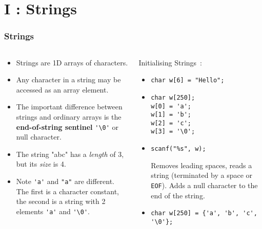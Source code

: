 \section{I : Strings}
\label{chap:str}


\begin{frame}[fragile]
\frametitle{Strings}
\begin{columns}
\begin{column}{0.45\textwidth}
\begin{itemize}[<+->]
\item Strings are 1D arrays of characters.
\item Any character in a string may be accessed as an array
element.
\item The important difference between strings and ordinary arrays
is the {\bf end-of-string sentinel} \verb^'\0'^ or null character.
\item The string "abc" has a {\it length} of 3, but its {\it size} is 4.
\item Note \verb^'a'^ and \verb^"a"^ are different. The first is a
character constant, the second is a string with 2 elements
\verb^'a'^ and \verb^'\0'^.
\end{itemize}
\end{column}

\pause
\begin{column}{0.45\textwidth}
Initialising Strings~:
\begin{itemize}[<+->]
\item \verb^char w[6] = "Hello";^
\item \begin{verbatim}
char w[250];
w[0] = 'a';
w[1] = 'b';
w[2] = 'c';
w[3] = '\0';
\end{verbatim}
\item \begin{verbatim}
scanf("%s", w);
\end{verbatim}
Removes leading spaces, reads a string (terminated by a
space or \verb^EOF^). Adds a null character to the end
of the string.
\item \begin{verbatim}
char w[250] = {'a', 'b', 'c', '\0'};
\end{verbatim}
\end{itemize}
\end{column}

\end{columns}
\end{frame}

